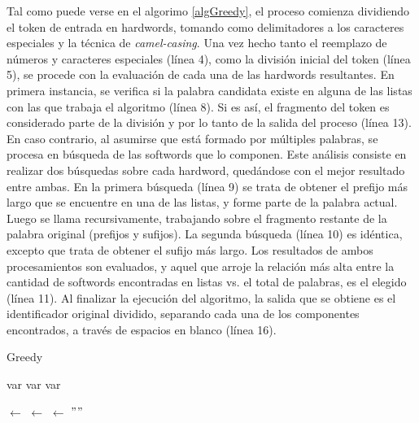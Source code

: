 Tal como puede verse en el algorimo \ref{algGreedy}, el proceso comienza dividiendo el token de entrada en hardwords, tomando como delimitadores a los caracteres especiales y la técnica de \textit{camel-casing}.
Una vez hecho tanto el reemplazo de números y caracteres especiales (línea 4), como la división inicial del token (línea 5), se procede con la evaluación de cada una de las hardwords resultantes.
En primera instancia, se verifica si la palabra candidata existe en alguna de las listas con las que trabaja el algoritmo (línea 8). Si es así, el fragmento del token es considerado parte de la división y por lo tanto de la salida del proceso (línea 13).
En caso contrario, al asumirse que está formado por múltiples palabras, se procesa en búsqueda de las softwords que lo componen.
Este análisis consiste en realizar dos búsquedas sobre cada hardword, quedándose con el mejor resultado entre ambas.
En la primera búsqueda (línea 9) se trata de obtener el prefijo más largo que se encuentre en una de las listas, y forme parte de la palabra actual. Luego se llama recursivamente, trabajando sobre el fragmento restante de la palabra original (prefijos y sufijos).
La segunda búsqueda (línea 10) es idéntica, excepto que trata de obtener el sufijo más largo.
Los resultados de ambos procesamientos son evaluados, y aquel que arroje la relación más alta entre la cantidad de softwords encontradas en listas vs. el total de palabras, es el elegido (línea 11).
Al finalizar la ejecución del algoritmo, la salida que se obtiene es el identificador original dividido, separando cada una de los componentes encontrados, a través de espacios en blanco (línea 16).

\begin{algorithm}[H]
\caption{Greedy}
\label{algGreedy}
\DontPrintSemicolon
  
  
  
  \BlankLine
  var \Dictionary\;
  var \KnownAbbrs\;
  var \StopList\;
  
  \BlankLine
  \Token $\leftarrow$ \SplitChars\;
  \Token $\leftarrow$ \SplitLowerUpperCase\;
  \SplitToken $\leftarrow$ $""$\;
  
  \BlankLine
  \BlankLine
  \KwRet \SplitToken\;
\end{algorithm}

